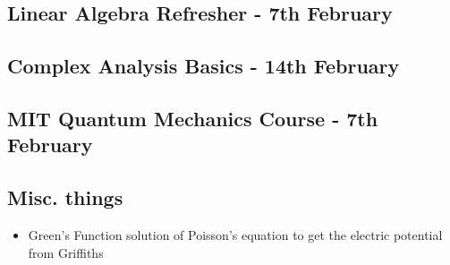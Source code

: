 \subsection*{Linear Algebra Refresher - 7th February}
\subsection*{Complex Analysis Basics - 14th February}
\subsection*{MIT Quantum Mechanics Course - 7th February}
\subsection*{Misc. things}
\begin{itemize}
    \item Green's Function solution of Poisson's equation to get the electric potential from Griffiths
\end{itemize}